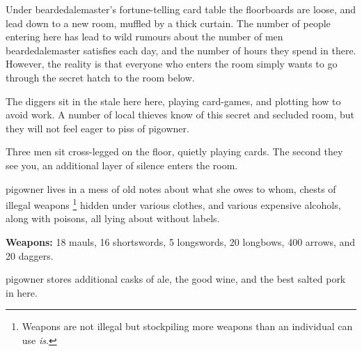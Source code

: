\begin{multicols}{2}
Under \gls{beardedalemaster}'s fortune-telling card table the floorboards are loose, and lead down to a new room, muffled by a thick curtain.
The number of people entering here has lead to wild rumours about the number of men \gls{beardedalemaster} satisfies each day, and the number of hours they spend in there.
However, the reality is that everyone who enters the room simply wants to go through the secret hatch to the room below.

\beardedalemaster


The \glspl{digger} sit in the stale here here, playing card-games, and plotting how to avoid work.
A number of local thieves know of this secret and secluded room, but they will not feel eager to piss of \gls{pigowner}.

\begin{boxtext}
  Three men sit cross-legged on the floor, quietly playing cards.
  The second they see you, an additional layer of silence enters the room.
\end{boxtext}



\Gls{pigowner} lives in a mess of old notes about what she owes to whom, chests of illegal weapons%
\footnote{Weapons are not illegal but stockpiling more weapons than an individual can use \emph{is}.}
hidden under various clothes, and various expensive alcohols, along with poisons, all lying about without labels.

\textbf{Weapons:} 18 mauls, 16 shortswords, 5 longswords, 20 longbows, 400 arrows, and 20 daggers.



\Gls{pigowner} stores additional casks of ale, the good wine, and the best salted pork in here.



\end{multicols}
